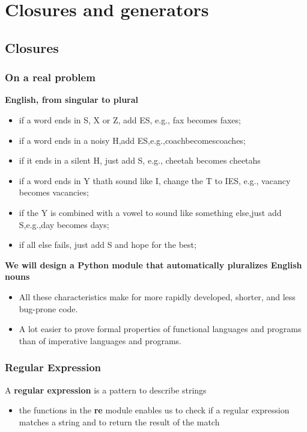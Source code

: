 \section{Closures and generators}

\subsection{Closures}

\subsubsection{On a real problem}

\textbf{English, from singular to plural}
\begin{itemize}
	\item if a word ends in S, X or Z, add ES, e.g., fax becomes faxes;
	\item if a word ends in a noisy H,add ES,e.g.,coachbecomescoaches;
	\item if it ends in a silent H, just add S, e.g., cheetah becomes cheetahs
	\item if a word ends in Y thath sound like I, change the T to IES, e.g., vacancy becomes vacancies;
	\item if the Y is combined with a vowel to sound like something else,just  add S,e.g.,day becomes days;
	\item if all else fails, just add S and hope for the best;
\end{itemize}

\textbf{We will design a Python module that automatically pluralizes English nouns}

\begin{itemize}
	\item All these characteristics make for more rapidly developed, shorter, and less bug-prone code.
	\item A lot easier to prove formal properties of functional languages and programs than of imperative languages and programs.
\end{itemize}

\subsubsection{Regular Expression}
A \textbf{regular expression} is a pattern to describe strings
\begin{itemize}
	\item the functions in the \textbf{re} module enables us to check if a regular expression matches a string and to return the result of the match
\end{itemize}

